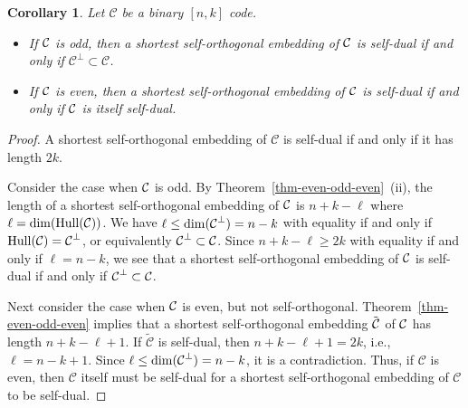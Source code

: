 \documentclass{article}
\newtheorem{cor}[theorem]{Corollary}
\theoremstyle{definition}
\theoremstyle{remark}
\newcommand{\C}{\mbox{$\cal C$}}
\begin{document}
\begin{cor}\label{cor-dual}
Let $\mathcal C$ be a binary $[n, k]$ code.

\begin{itemize}

\item If $\C$ is odd, then a shortest self-orthogonal embedding of $\C$ is self-dual if and only if $\mathcal C^{\perp} \subset \mathcal C$.


\item If $\C$ is even, then a shortest self-orthogonal embedding of $\C$ is self-dual if and only if $\C$ is itself self-dual.
\end{itemize}

\end{cor}

\begin{proof}


A shortest self-orthogonal embedding of $\mathcal C$ is self-dual if and only if it has length $2k$.

Consider the case when $\C$ is odd. By Theorem~\ref{thm-even-odd-even}~(ii), the length of a shortest self-orthogonal embedding of $\C$ is $n + k - \ell$ where $\ell =\dim({\rm{Hull}}(\mathcal C))$. We have $\ell \le \dim(\C^{\perp})=n-k$ with equality if and only if $\operatorname{Hull}(\C)=\C^{\perp}$, or equivalently $\C^{\perp} \subset \C$. Since $n + k - \ell \ge 2k$ with equality if and only if $\ell =n -k$, we see that a shortest self-orthogonal embedding of $\C$ is self-dual if and only if $\C^{\perp} \subset \C$.

Next consider the case when $\C$ is even, but not self-orthogonal. Theorem~\ref{thm-even-odd-even} implies that a shortest self-orthogonal embedding $\tilde{\C}$ of $\C$ has length $n+k -\ell +1$. If $\tilde{\mathcal{C}}$ is self-dual, then $n+k-\ell+1=2k$, i.e., $\ell=n-k+1$. Since $\ell \le \dim(\C^{\perp})=n-k$, it is a contradiction. Thus, if \(\mathcal{C}\) is even, then \(\mathcal{C}\) itself must be self-dual for a shortest self-orthogonal embedding of \(\mathcal{C}\) to be self-dual.
\end{proof}
\end{document}
